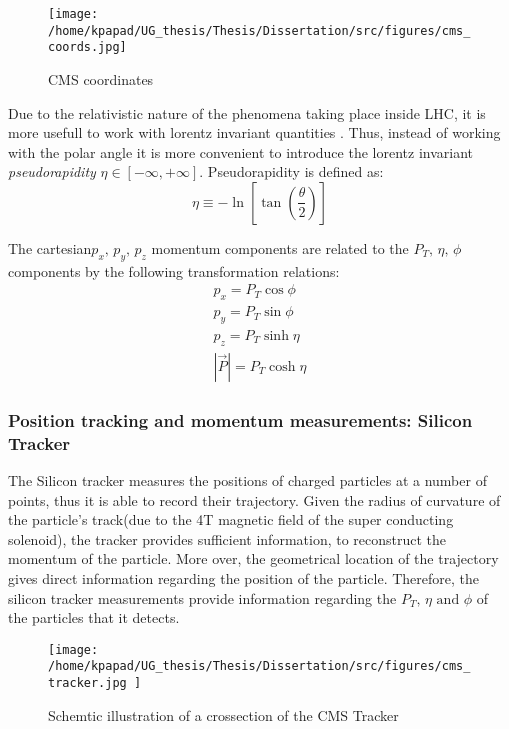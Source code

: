 \begin{figure}[h]
\centering
\texttt{[image: /home/kpapad/UG\_thesis/Thesis/Dissertation/src/figures/cms\_coords.jpg]}
\caption{CMS coordinates}
\label{fig:CMSCoords}
\end{figure}


Due to the relativistic nature of the phenomena taking place inside LHC, it is more usefull to work with lorentz invariant quantities \cite{AcceleratorsLecture}. Thus, instead of working with the polar angle it is more convenient to introduce the lorentz invariant  \emph{pseudorapidity} \(\eta\in \left [ -\infty, +\infty \right ]\).  Pseudorapidity is defined as:
\begin{equation}
\eta \equiv -\ln{\left [ \tan\left (\frac{\theta}{2} \right ) \right]  }
\end{equation}

The cartesian\(p_{x}\text{, } p_{y}\text{, }p_{z}\) momentum components are related to the \(P_{T}\text{, }\eta\text{, }\phi\)  components by the following transformation relations:
\begin{equation}
\begin{matrix}
p_{x} = P_{T}\cos{\phi} \\
p_{y} = P_{T}\sin{\phi} \\
p_{z} = P_{T}\sinh{\eta}\\
|\vec{P}| = P_{T}\cosh{\eta} 
\end{matrix}
\end{equation}

\subsubsection{Position tracking and momentum measurements: Silicon Tracker}
\label{sec:org2c477d8}
The Silicon tracker measures the positions of charged particles at a number of points, thus it is able to record their trajectory. Given the radius of curvature of the particle's track(due to the 4T magnetic field of the super conducting solenoid), the tracker provides sufficient information, to reconstruct the momentum of the particle. More over, the geometrical location of the trajectory gives direct information regarding the position of the particle. Therefore, the silicon tracker measurements  provide  information regarding the \(P_{T}\text{, } \eta\text{ and }\phi\) of the particles that it detects.

\begin{figure}[h]
\centering
\texttt{[image: /home/kpapad/UG\_thesis/Thesis/Dissertation/src/figures/cms\_tracker.jpg ]}
\caption{Schemtic illustration of a crossection of the CMS Tracker }
\label{fig:si_tracker}
\end{figure}


